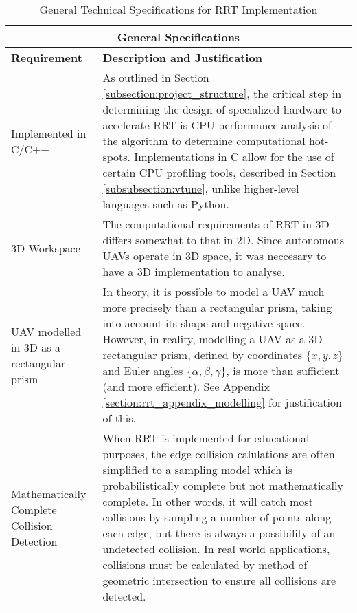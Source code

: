 
\begin{table}[H]
\begin{center}
\begin{tabular}{|p{.2\linewidth}|p{.74\linewidth}|}
    \hline
    \multicolumn{2}{|c|}{\textbf{General Specifications}} \\
    \hline
    \textbf{Requirement}             & \textbf{Description and Justification} \\
    \hline
    Implemented in C/C++    & 
        As outlined in Section \ref{subsection:project_structure}, the critical step in determining the design of specialized hardware to accelerate \gls{RRT} is CPU performance analysis of the algorithm to determine computational hot-spots. Implementations in C allow for the use of certain CPU profiling tools, described in Section \ref{subsubsection:vtune}, unlike higher-level languages such as Python. \\
    \hline
    3D Workspace            & 
        The computational requirements of \gls{RRT} in \gls{3D} differs somewhat to that in \gls{2D}. Since autonomous \glspl{UAV} operate in 3D space, it was neccesary to have a \gls{3D} implementation to analyse. \\
    \hline
    \Gls{UAV} modelled in \gls{3D} as a rectangular prism  & 
        In theory, it is possible to model a \gls{UAV} much more precisely than a rectangular prism, taking into account its shape and negative space. However, in reality, modelling a \gls{UAV} as a \gls{3D} rectangular prism, defined by coordinates $\{x, y, z\}$ and Euler angles $\{\alpha, \beta, \gamma \}$, is more than sufficient (and more efficient). See Appendix \ref{section:rrt_appendix_modelling} for justification of this. \\
    \hline
    Mathematically Complete Collision Detection & 
        When \gls{RRT} is implemented for educational purposes, the edge collision calulations are often simplified to a sampling model which is \gls{probabilistically complete} but not \gls{mathematically complete}. In other words, it will catch most collisions by sampling a number of points along each edge, but there is always a possibility of an undetected collision. In real world applications, collisions must be calculated by method of geometric intersection to ensure all collisions are detected. \\
    \hline
\end{tabular}
\caption{General Technical Specifications for \gls{RRT} Implementation}
\label{table:RRT_Tech_Specs_General}
\end{center}
\end{table}

